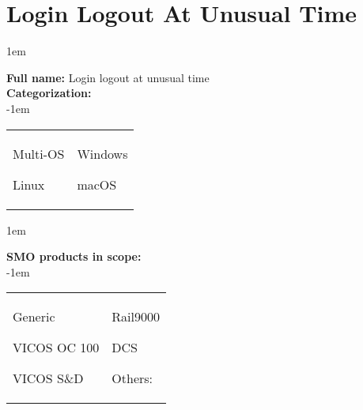 
%
%

\section{Login Logout At Unusual Time}
\label{15022}

\openup 1em

\textbf{Full name:} Login logout at unusual time\hrulefill \\
{\bf Categorization:} \\

\openup -1em
\vspace{-3em}

\begin{tabular}{p{}p{}}

\begin{todolist}
  	\item Multi-OS
	\item Linux
\end{todolist}
&
\begin{todolist}
	\item[\done] Windows
	\item macOS
\end{todolist}

\end{tabular}

\openup 1em

{\bf SMO products in scope:} \\

\openup -1em
\vspace{-3em}

\begin{tabular}{p{}p{}}

\begin{todolist}
  \item[\done] Generic
  \item[\done] VICOS OC 100
  \item[\done] VICOS S\&D
\end{todolist}
&
\begin{todolist}
  \item Rail9000
  \item DCS
  \item Others: \hrulefill
\end{todolist}

\end{tabular}

